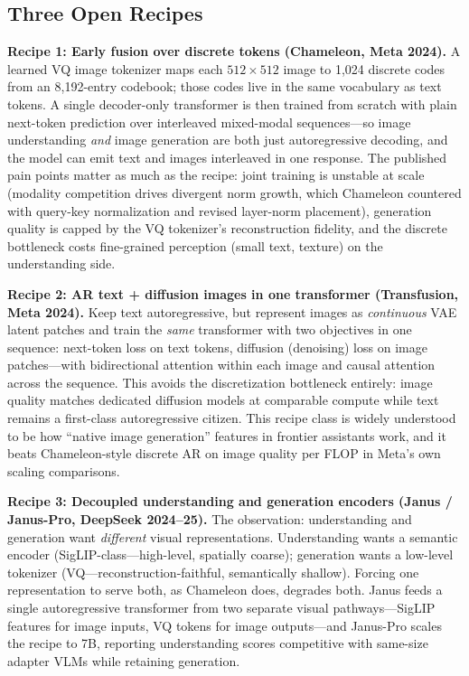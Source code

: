 \subsection{Three Open Recipes}

\textbf{Recipe 1: Early fusion over discrete tokens (Chameleon, Meta 2024).} A learned VQ image tokenizer maps each $512 \times 512$ image to 1{,}024 discrete codes from an 8{,}192-entry codebook; those codes live in the same vocabulary as text tokens. A single decoder-only transformer is then trained from scratch with plain next-token prediction over interleaved mixed-modal sequences---so image understanding \textit{and} image generation are both just autoregressive decoding, and the model can emit text and images interleaved in one response. The published pain points matter as much as the recipe: joint training is unstable at scale (modality competition drives divergent norm growth, which Chameleon countered with query-key normalization and revised layer-norm placement), generation quality is capped by the VQ tokenizer's reconstruction fidelity, and the discrete bottleneck costs fine-grained perception (small text, texture) on the understanding side.

\textbf{Recipe 2: AR text + diffusion images in one transformer (Transfusion, Meta 2024).} Keep text autoregressive, but represent images as \textit{continuous} VAE latent patches and train the \textit{same} transformer with two objectives in one sequence: next-token loss on text tokens, diffusion (denoising) loss on image patches---with bidirectional attention within each image and causal attention across the sequence. This avoids the discretization bottleneck entirely: image quality matches dedicated diffusion models at comparable compute while text remains a first-class autoregressive citizen. This recipe class is widely understood to be how ``native image generation'' features in frontier assistants work, and it beats Chameleon-style discrete AR on image quality per FLOP in Meta's own scaling comparisons.

\textbf{Recipe 3: Decoupled understanding and generation encoders (Janus / Janus-Pro, DeepSeek 2024--25).} The observation: understanding and generation want \textit{different} visual representations. Understanding wants a semantic encoder (SigLIP-class---high-level, spatially coarse); generation wants a low-level tokenizer (VQ---reconstruction-faithful, semantically shallow). Forcing one representation to serve both, as Chameleon does, degrades both. Janus feeds a single autoregressive transformer from two separate visual pathways---SigLIP features for image inputs, VQ tokens for image outputs---and Janus-Pro scales the recipe to 7B, reporting understanding scores competitive with same-size adapter VLMs while retaining generation.

